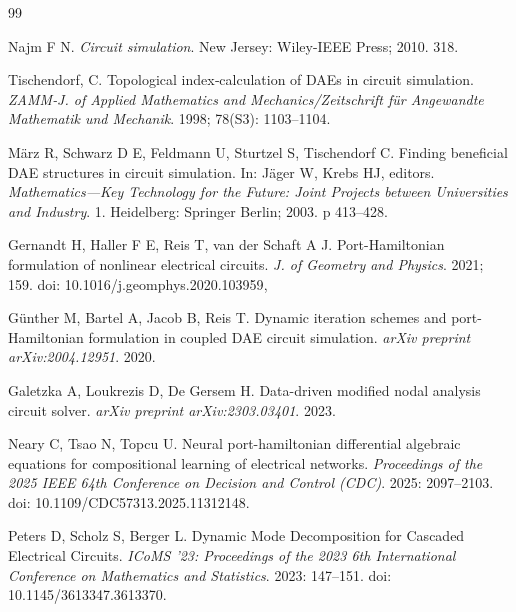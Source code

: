 \documentclass[a4paper, 10pt, twoside, twocolumn]{scrartcl}
\begin{document}
\begin{thebibliography}{99}
	{\small\fontsize{9.4}{1.2em}\selectfont
		\setlength{\parskip}{-0.5mm}
		\vspace{-3mm}
		
		\raggedright
		Najm F N. {\itshape Circuit simulation}. New Jersey: Wiley-IEEE Press; 2010. 318.
		
		\raggedright
		Tischendorf, C. Topological index‐calculation of DAEs in circuit simulation. {\itshape ZAMM‐J. of Applied Mathematics and Mechanics/Zeitschrift für Angewandte Mathematik und Mechanik}. 1998; 78(S3): 1103--1104.
		
		\raggedright
		M{\"a}rz R,  Schwarz  D E, Feldmann U, Sturtzel S, Tischendorf C. Finding beneficial DAE structures in circuit simulation. In: J{\"a}ger W, Krebs HJ, editors.  {\itshape Mathematics—Key Technology for the Future: Joint Projects between Universities and Industry}. 1. Heidelberg: Springer Berlin; 2003. p 413--428.
			
		
		\raggedright
		Gernandt H, Haller F E, Reis T, van der Schaft A J.	Port-Hamiltonian formulation of nonlinear electrical circuits. 
		{\itshape J. of Geometry and Physics}. 2021; 159. doi: {10.1016/j.geomphys.2020.103959},
		
		\raggedright
		G{\"u}nther M, Bartel A, Jacob B, Reis T. Dynamic iteration schemes and port-Hamiltonian formulation in coupled DAE circuit simulation. {\itshape arXiv preprint arXiv:2004.12951}. 2020.
		
		\raggedright
		Galetzka A, Loukrezis D, De Gersem H. Data-driven modified nodal analysis circuit solver. {\itshape arXiv preprint arXiv:2303.03401}. 2023.
		
		\raggedright
		Neary C, Tsao N, Topcu U. Neural port-hamiltonian differential algebraic equations for compositional learning of electrical networks. {\itshape Proceedings of the 2025 IEEE 64th Conference on Decision and Control (CDC)}. 2025: 2097--2103. doi: {10.1109/CDC57313.2025.11312148}.

		\raggedright
		Peters D, Scholz S, Berger L. Dynamic Mode Decomposition for Cascaded Electrical Circuits. {\itshape ICoMS '23: Proceedings of the 2023 6th International Conference on Mathematics and Statistics}. 2023: 147--151. doi: {10.1145/3613347.3613370}.		
		
}
\end{thebibliography}
\end{document}
